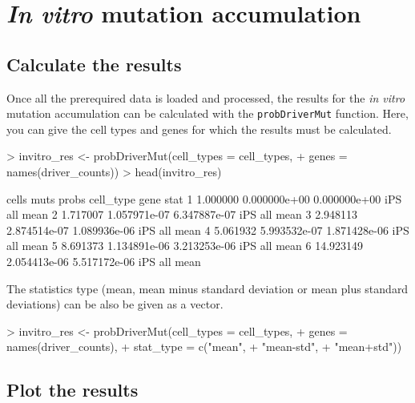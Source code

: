 \documentclass{article}
\begin{document}
\section{\textit{In vitro} mutation accumulation}
\subsection{Calculate the results}

Once all the prerequired data is loaded and processed, the results for the 
\textit{in vitro} mutation accumulation can
be calculated with the \texttt{probDriverMut} function. Here, you can give the
cell types and genes for which the results must be calculated. 

\begin{Schunk}
\begin{Sinput}
> invitro_res <- probDriverMut(cell_types = cell_types, 
+                              genes = names(driver_counts))
> head(invitro_res)
\end{Sinput}
\begin{Soutput}
      cells         muts        probs cell_type gene stat
1  1.000000 0.000000e+00 0.000000e+00       iPS  all mean
2  1.717007 1.057971e-07 6.347887e-07       iPS  all mean
3  2.948113 2.874514e-07 1.089936e-06       iPS  all mean
4  5.061932 5.993532e-07 1.871428e-06       iPS  all mean
5  8.691373 1.134891e-06 3.213253e-06       iPS  all mean
6 14.923149 2.054413e-06 5.517172e-06       iPS  all mean
\end{Soutput}
\end{Schunk}

The statistics type (mean, mean minus standard deviation or mean plus standard
deviations) can be also be given as a vector.

\begin{Schunk}
\begin{Sinput}
> invitro_res <- probDriverMut(cell_types = cell_types, 
+                              genes = names(driver_counts), 
+                              stat_type = c("mean",
+                                            "mean-std",
+                                            "mean+std"))
\end{Sinput}
\end{Schunk}

\subsection{Plot the results}
\end{document}
